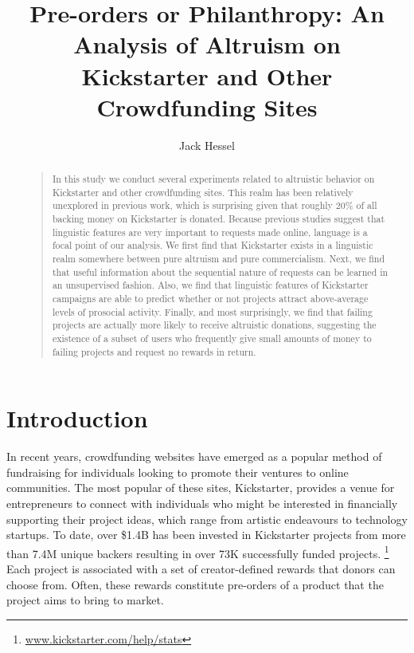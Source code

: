 \documentclass[letterpaper]{article}
\begin{document}
%
\title{Pre-orders or Philanthropy: An Analysis of Altruism on Kickstarter and Other Crowdfunding Sites}
\author{Jack Hessel}
\maketitle
\begin{abstract}
\begin{quote}
In this study we conduct several experiments related to altruistic behavior on Kickstarter and other crowdfunding sites. This realm has been relatively unexplored in previous work, which is surprising given that roughly 20\% of all backing money on Kickstarter is donated. Because previous studies suggest that linguistic features are very important to requests made online, language is a focal point of our analysis. We first find that Kickstarter exists in a linguistic realm somewhere between pure altruism and pure commercialism. Next, we find that useful information about the sequential nature of requests can be learned in an unsupervised fashion. Also, we find that linguistic features of Kickstarter campaigns are able to predict whether or not projects attract above-average levels of prosocial activity. Finally, and most surprisingly, we find that failing projects are actually more likely to receive altruistic donations, suggesting the existence of a subset of users who frequently give small amounts of money to failing projects and request no rewards in return.
\end{quote}
\end{abstract}

\section{Introduction}

In recent years, crowdfunding websites have emerged as a popular method of fundraising for individuals looking to promote their ventures to online communities. The most popular of these sites, Kickstarter, provides a venue for entrepreneurs to connect with individuals who might be interested in financially supporting their project ideas, which range from artistic endeavours to technology startups. To date, over \$1.4B has been invested in Kickstarter projects from more than 7.4M unique backers resulting in over 73K successfully funded projects. \footnote{ \url{www.kickstarter.com/help/stats}} Each project is associated with a set of creator-defined rewards that donors can choose from. Often, these rewards constitute pre-orders of a product that the project aims to bring to market.
\end{document}
